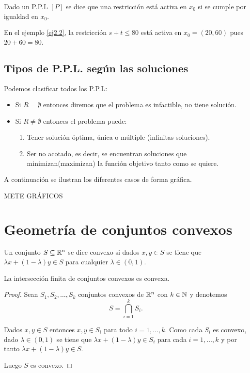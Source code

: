 \begin{definicion}
  Dado un P.P.L $[P]$ se dice que una restricción está activa en $x_0$ si se cumple por igualdad en $x_0$.
\end{definicion}

En el ejemplo \ref{ej2.2}, la restricción $s+t\le80$ está activa en $x_0=(20,60)$ pues $20+60=80$.

\subsection{Tipos de P.P.L. según las soluciones}

Podemos clasificar todos los P.P.L:

\begin{itemize}
  \item Si $R=\emptyset$ entonces diremos que el problema es infactible, no tiene solución.
  
  \item Si $R\neq\emptyset$ entonces el problema puede:
  \begin{enumerate}
    \item Tener solución óptima, única o múltiple (infinitas soluciones).
    \item Ser no acotado, es decir, se encuentran soluciones que minimizan(maximizan) la función objetivo tanto como se quiere.
  \end{enumerate}
\end{itemize}

A continuación se ilustran los diferentes casos de forma gráfica.

\LARGE{METE GRÁFICOS}
\normalsize

\section{Geometría de conjuntos convexos}

\begin{definicion}
  Un conjunto $S\subseteq \mathbb R^n$ se dice convexo si dados $x,y\in S$ se tiene que $\lambda x + (1-\lambda)y\in S$ para cualquier $\lambda\in (0,1)$.
\end{definicion}

\begin{proposicion}\label{prop2.1}
  La intersección finita de conjuntos convexos es convexa.	
\end{proposicion}

\begin{proof}
  Sean $S_1,S_2,\dots,S_k$ conjuntos convexos de $\mathbb R^n$ con $k\in\mathbb N$ y denotemos
  $$ S = \displaystyle\bigcap_{i=1}^k S_i.$$
  
  Dados $x,y \in S$ entonces $x,y\in S_i$ para todo $i=1,\dots,k$. Como cada $S_i$ es convexo, dado $\lambda\in(0,1)$ se tiene que $\lambda x +(1-\lambda) y \in S_i $ para cada $i=1,\dots,k$ y por tanto $\lambda x +(1-\lambda) y \in S$.
  
  Luego $S$ es convexo.
  
\end{proof}

